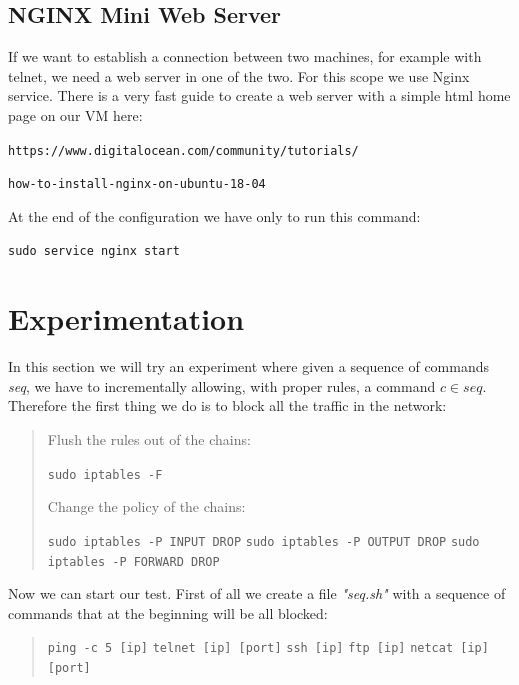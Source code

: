 \documentclass[11pt]{article}
\begin{document}
\subsection{NGINX Mini Web Server}
If we want to establish a connection between two machines, for example with telnet, we need a web server in one of the two. For this scope we use Nginx service. There is a very fast guide to create a web server with a simple html home page on our VM here:

\verb|https://www.digitalocean.com/community/tutorials/|

\verb|how-to-install-nginx-on-ubuntu-18-04|

\bigskip
At the end of the configuration we have only to run this command:

\texttt{sudo service nginx start}

\section{Experimentation}
In this section we will try an experiment where given a sequence of commands {\em seq}, we have to incrementally allowing, with proper rules, a command $c \in seq$. Therefore the first thing we do is to block all the traffic in the network:

\begin{quote}
  Flush the rules out of the chains:

  \texttt{sudo iptables -F}\newline

  Change the policy of the chains:

  \texttt{sudo iptables -P INPUT DROP}\newline
  \texttt{sudo iptables -P OUTPUT DROP}\newline
  \texttt{sudo iptables -P FORWARD DROP}\newline
\end{quote}

Now we can start our test. First of all we create a file {\em "seq.sh"} with a sequence of commands that at the beginning will be all blocked:

\begin{quote}
  \texttt{ping -c 5 [ip]}\newline
  \texttt{telnet [ip] [port]}\newline
  \texttt{ssh [ip]}\newline
  \texttt{ftp [ip]}\newline
  \texttt{netcat [ip] [port]}
\end{quote}
\end{document}

